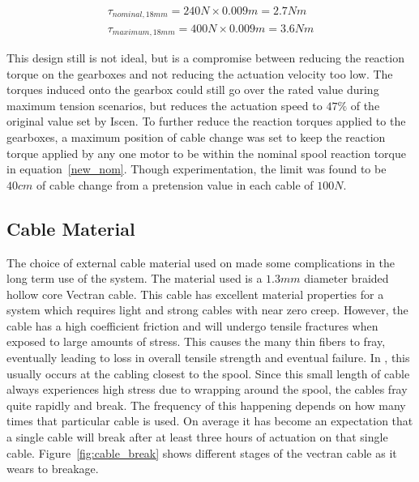 \begin{appendices}
\begin{align}
\tau_{nominal, 18mm} = 240N \times 0.009m = 2.7Nm \label{new_nom} \\
\tau_{maximum, 18mm} = 400N \times 0.009m = 3.6Nm \label{new_max}
\end{align}

This design still is not ideal, but is a compromise between reducing the reaction torque on the gearboxes and not reducing the actuation velocity too low.
The torques induced onto the gearbox could still go over the rated value during maximum tension scenarios, but reduces the actuation speed to \(47\%\) of the original value set by Iscen.
To further reduce the reaction torques applied to the gearboxes, a maximum position of cable change was set to keep the reaction torque applied by any one motor to be within the nominal spool reaction torque in equation~\ref{new_nom}.
Though experimentation, the limit was found to be \(40cm\) of cable change from a pretension value in each cable of \(100N\).

\subsection{Cable Material}
The choice of external cable material used on \SB{} made some complications in the long term use of the system.
The material used is a \(1.3mm\) diameter braided hollow core Vectran cable.
This cable has excellent material properties for a system which requires light and strong cables with near zero creep.
However, the cable has a high coefficient friction and will undergo tensile fractures when exposed to large amounts of stress.
This causes the many thin fibers to fray, eventually leading to loss in overall tensile strength and eventual failure. 
In \SB{}, this usually occurs at the cabling closest to the spool. 
Since this small length of cable always experiences high stress due to wrapping around the spool, the cables fray quite rapidly and break.
The frequency of this happening depends on how many times that particular cable is used.
On average it has become an expectation that a single cable will break after at least three hours of actuation on that single cable. 
Figure~\ref{fig:cable_break} shows different stages of the vectran cable as it wears to breakage.


\end{appendices}
